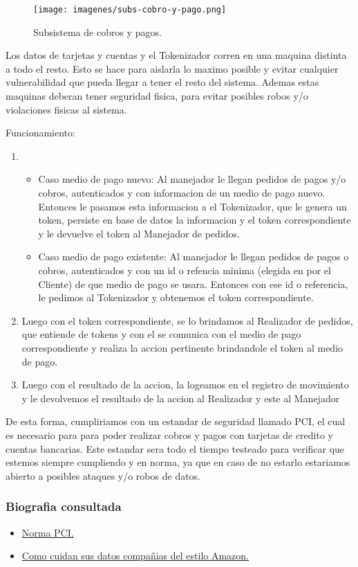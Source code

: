\begin{figure}[H]
  \centering
  \texttt{[image: imagenes/subs-cobro-y-pago.png]}
  \caption{Subsistema de cobros y pagos.}
\end{figure}

Los datos de tarjetas y cuentas y el Tokenizador corren en una maquina distinta a todo el resto. Esto se hace para aislarla lo maximo posible y evitar cualquier vulnerabilidad que pueda llegar a tener el resto del sistema. Ademas estas maquinas deberan tener seguridad fisica, para evitar posibles robos y/o violaciones fisicas al sistema.

Funcionamiento:
\begin{enumerate}
\item {
  \begin{itemize}
  \item Caso medio de pago nuevo:
  Al manejador le llegan pedidos de pagos y/o cobros, autenticados y con informacion de un medio de pago nuevo. Entonces le pasamos esta informacion a el Tokenizador, que le genera un token, persiste en base de datos la informacion y el token correspondiente y le devuelve el token al Manejador de pedidos.
  \item Caso medio de pago existente:
  Al manejador le llegan pedidos de pagos o cobros, autenticados y con un id o refencia minima (elegida en por el Cliente) de que medio de pago se usara. Entonces con ese id o referencia, le pedimos al Tokenizador y obtenemos el token correspondiente.
  \end{itemize}
}

\item Luego con el token correspondiente, se lo brindamos al Realizador de pedidos, que entiende de tokens y con el se comunica con el medio de pago correspondiente y realiza la accion pertinente brindandole el token al medio de pago.

\item Luego con el resultado de la accion, la logeamos en el registro de movimiento y le devolvemos el resultado de la accion al Realizador y este al Manejador
\end{enumerate}

De esta forma, cumpliriamos con un estandar de seguridad llamado PCI, el cual es necesario para para poder realizar cobros y pagos con tarjetas de credito y cuentas bancarias. Este estandar sera todo el tiempo testeado para verificar que estemos siempre cumpliendo y en norma, ya que en caso de no estarlo estariamos abierto a posibles ataques y/o robos de datos.

\subsubsection{Biografia consultada}
\begin{itemize}
\item \href{https://www.pcisecuritystandards.org/documents/Tokenization_Guidelines_Info_Supplement.pdf}{Norma PCI.}\\
\item \href{https://www.quora.com/Do-companies-like-Amazon-etc-have-a-server-farm-to-store-creditcard-information-on-database}{Como cuidan sus datos compañias del estilo Amazon.}
\end{itemize}
